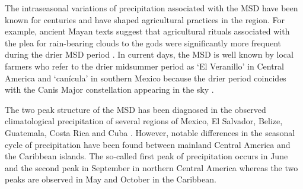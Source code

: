 

The intraseasonal variations of precipitation associated with the MSD have been known for centuries and have shaped agricultural practices in the region. 
For example,  ancient Mayan texts suggest that agricultural rituals associated with the plea for rain-bearing clouds to the gods were significantly more frequent during the drier MSD period \citep{jobbova2018ritual}. In current days, the MSD is well known by local farmers who refer to the drier midsummer period as `El Veranillo' in Central America and `can\' icula' in southern Mexico because the drier period  coincides with the Canis Major constellation appearing in the sky \citep{dilley1996}.

%

The two peak structure of the MSD has been diagnosed in the observed climatological precipitation of several regions of Mexico, El Salvador, Belize, Guatemala, Costa Rica and Cuba \citep[e.g.][]{mosino1966,magana1999,duranquesada2017,perdigon2018,martinez2019}.
However, notable differences in the seasonal cycle of precipitation have been found between mainland Central America and the Caribbean islands. The so-called first peak of precipitation occurs in June and the second peak in September in northern Central America whereas the two peaks are observed in May and October in the Caribbean.

